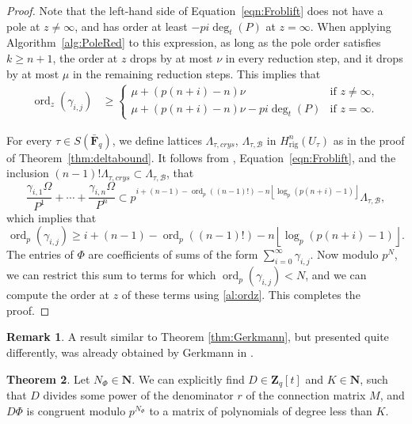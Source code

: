 \documentclass[a4paper,11pt]{article}
\numberwithin{equation}{section}
\providecommand{\floor}[1]{\left\lfloor#1\right\rfloor}   %
\newcommand{\NN}{\mathbf{N}} %
\newcommand{\ZZ}{\mathbf{Z}} %
\newcommand{\FF}{\mathbf{F}} %
\DeclareMathOperator{\ord}{ord}          %
\providecommand{\Hrig}{H_{\text{rig}}}  %
\providecommand{\cB}{\mathcal{B}} %
\theoremstyle{definition}
\newtheorem{thm}{Theorem}[section]
\newtheorem{rem}[thm]{Remark}
\begin{document}
\begin{proof}
Note that the left-hand side of Equation~\eqref{eqn:Froblift} does not have a pole
at $z \neq \infty$, and has order at least $-pi\deg_t(P)$ at $z=\infty$. When applying 
Algorithm~\ref{alg:PoleRed} to this expression, as long as the pole order satisfies 
$k \geq n+1$, the order at $z$ drops by at most $\nu$ in every reduction step, 
and it drops by at most $\mu$ in the remaining reduction steps. This implies that
\begin{align} \label{al:ordz}
\ord_z(\gamma_{i,j}) &\geq 
\begin{cases}
\mu + (p(n+i)-n) \nu                 &\mbox{if } z \neq \infty, \\
\mu + (p(n+i)-n) \nu - pi \deg_t(P)  &\mbox{if } z=\infty.
\end{cases}
\end{align}

For every $\tau \in S(\bar{\FF}_q)$, we
define lattices $\Lambda_{\tau,crys}$, $\Lambda_{\tau,\cB}$ in $\Hrig^n(U_{\tau})$
as in the proof of Theorem~\ref{thm:deltabound}. It follows from
\citep[Proposition 3.4.6]{AbbottKedlayaRoe2006}, Equation~\eqref{eqn:Froblift}, 
and the inclusion $(n-1)!\Lambda_{\tau,crys} \subset \Lambda_{\tau,\cB}$, that
\begin{equation*}
\frac{\gamma_{i,1} \Omega}{P^1}+\dotsb+\frac{\gamma_{i,n} \Omega}{P^n} \subset 
p^{i+(n-1)-\ord_p((n-1)!)-n \floor{\log_p(p(n+i)-1)}} \Lambda_{\tau,\cB},
\end{equation*}
which implies that
\begin{equation*}
\ord_p(\gamma_{i,j}) \geq i+(n-1) - \ord_p((n-1)!) - n \floor{\log_p(p(n+i)-1)}.
\end{equation*}
The entries of $\Phi$ are coefficients of sums of the form 
$\sum_{i=0}^{\infty} \gamma_{i,j}$. Now modulo $p^N$, we can 
restrict this sum to terms for which $\ord_p(\gamma_{i,j})<N$,
and we can compute the order at $z$ of these terms using
\eqref{al:ordz}. This completes the proof.
\end{proof}

\begin{rem}
A result similar to Theorem \ref{thm:Gerkmann}, but presented quite 
differently, was already obtained by Gerkmann in \citep[Section 6]{Gerkmann2007}.
\end{rem}

\begin{thm} \label{thm:defD}
Let $N_{\Phi} \in \NN$. We can explicitly find $D \in \ZZ_q[t]$ and
$K \in \NN$, such that $D$ divides some power of the denominator $r$ 
of the connection matrix $M$, and $D \Phi$ is congruent modulo $p^{N_{\Phi}}$ 
to a matrix of polynomials of degree less than $K$.
\end{thm}
\end{document}
